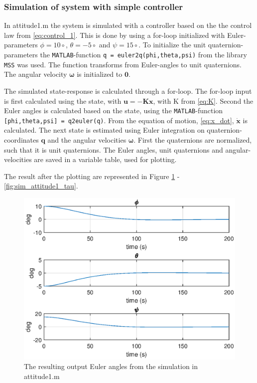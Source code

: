 \subsubsection*{Simulation of system with simple controller}

In {\color{blue}  attitude1.m } the system is simulated with a controller based on the the control law from \eqref{eq:control_1}. This is done by using a for-loop initialized with Euler-parameters $\phi = 10 \circ$, $\theta = -5 \circ$ and $\psi = 15  \circ$. To initialize the unit quaternion-parameters the \texttt{MATLAB}-function \texttt{q = euler2q(phi,theta,psi)} from the library \texttt{MSS} was used. The function transforms from Euler-angles to unit quaternions. The angular velocity $\boldsymbol{\omega}$ is initialized to $\mathbf{0}$. 
 
The simulated state-response is calculated through a for-loop. The for-loop input is first calculated using the state, with $\mathbf{u} = -\mathbf{K}\mathbf{x}$, with K from \eqref{eq:K}. Second the Euler angles is calculated based on the state, using the  \texttt{MATLAB}-function \texttt{[phi,theta,psi] = q2euler(q)}.  From the equation of motion, \eqref{eq:x_dot}, $\dot{\mathbf{x}}$ is calculated. The next state is estimated using Euler integration on quaternion-coordinates $\mathbf{q}$ and the angular velocities $\mathbf{\omega}$. First the quaternions are normalized, such that it is unit quaternions. The Euler angles, unit quaternions and angular-velocities are saved in a variable table, used for plotting.

The result after the plotting are represented in Figure \ref{fig:sim_attitude1_euler} - \ref{fig:sim_attitude1_tau}. 

\begin{figure}[htb!]
	\centering
	\includegraphics[width=1.00\textwidth]{figures/1_euler.eps}
	\caption{The resulting output Euler angles from the simulation in {\color{blue}attitude1.m}}
\label{fig:sim_attitude1_euler}
\end{figure}

